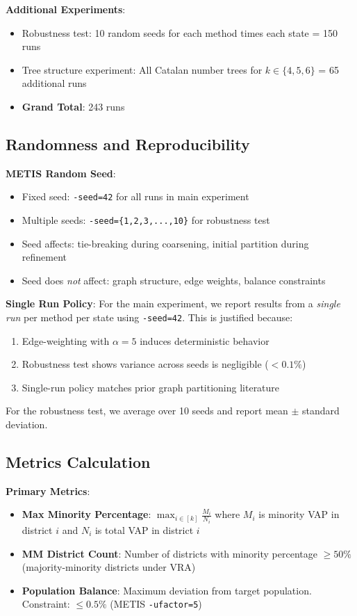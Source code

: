 \textbf{Additional Experiments}:
\begin{itemize}
    \item Robustness test: 10 random seeds for each method times each state = 150 runs
    \item Tree structure experiment: All Catalan number trees for $k \in \{4,5,6\}$ = 65 additional runs
    \item \textbf{Grand Total}: 243 runs
\end{itemize}

\subsection{Randomness and Reproducibility}

\textbf{METIS Random Seed}:
\begin{itemize}
    \item Fixed seed: \texttt{-seed=42} for all runs in main experiment
    \item Multiple seeds: \texttt{-seed=\{1,2,3,...,10\}} for robustness test
    \item Seed affects: tie-breaking during coarsening, initial partition during refinement
    \item Seed does \textit{not} affect: graph structure, edge weights, balance constraints
\end{itemize}

\textbf{Single Run Policy}:
For the main experiment, we report results from a \textit{single run} per method per state using \texttt{-seed=42}. This is justified because:
\begin{enumerate}
    \item Edge-weighting with $\alpha = 5$ induces deterministic behavior
    \item Robustness test shows variance across seeds is negligible ($< 0.1\%$)
    \item Single-run policy matches prior graph partitioning literature~\cite{karypis1998fast,karypis2000multilevel}
\end{enumerate}

For the robustness test, we average over 10 seeds and report mean $\pm$ standard deviation.

\subsection{Metrics Calculation}

\textbf{Primary Metrics}:
\begin{itemize}
    \item \textbf{Max Minority Percentage}: $\max_{i \in [k]} \frac{M_i}{N_i}$ where $M_i$ is minority VAP in district $i$ and $N_i$ is total VAP in district $i$

    \item \textbf{MM District Count}: Number of districts with minority percentage $\geq 50\%$ (majority-minority districts under VRA)

    \item \textbf{Population Balance}: Maximum deviation from target population. Constraint: $\leq 0.5\%$ (METIS \texttt{-ufactor=5})
\end{itemize}

